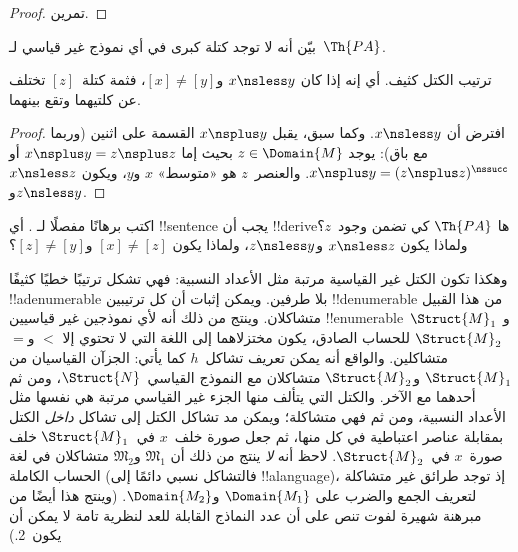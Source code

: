 \documentclass[../../../include/open-logic-section]{subfiles}
\begin{document}
\begin{proof}
تمرين.
\end{proof}

\begin{prob}
بيّن أنه لا توجد كتلة كبرى في أي نموذج غير قياسي لـ~$\Th{PA}$.
\end{prob}

\begin{prop}
ترتيب الكتل كثيف. أي إنه إذا كان $x \nsless y$ و$[x] \neq [y]$،
فثمة كتلة~$[z]$ تختلف عن كلتيهما وتقع بينهما.
\end{prop}

\begin{proof}
افترض أن $x \nsless y$. وكما سبق، يقبل $x \nsplus y$ القسمة على
اثنين (وربما مع باق): يوجد $z \in \Domain{M}$ بحيث إما
$x \nsplus y = z \nsplus z$ أو
$x \nsplus y = (z \nsplus z)^\nssucc$. والعنصر~$z$ هو
«متوسط» $x$ و$y$، ويكون $x \nsless z$ و$z \nsless y$.
\end{proof}

\begin{prob}
اكتب برهانًا مفصلًا لـ
. أي !!{sentence} يجب أن
!!{derive}ها $\Th{PA}$ كي تضمن وجود~$z$؟ ولماذا يكون $x \nsless z$
و$z \nsless y$، ولماذا يكون $[x] \neq [z]$ و$[z] \neq [y]$؟
\end{prob}

\begin{explain}
وهكذا تكون الكتل غير القياسية مرتبة مثل الأعداد النسبية: فهي تشكل
ترتيبًا خطيًا كثيفًا !!a{denumerable} بلا طرفين. ويمكن إثبات أن كل ترتيبين
!!{denumerable} من هذا القبيل متشاكلان. وينتج من ذلك أنه لأي نموذجين
غير قياسيين !!{enumerable}~$\Struct{M}_1$ و$\Struct{M}_2$ للحساب الصادق،
يكون مختزلاهما إلى اللغة التي لا تحتوي إلا $<$ و$=$ متشاكلين. والواقع
أنه يمكن تعريف تشاكل~$h$ كما يأتي: الجزآن القياسيان من $\Struct{M}_1$
و$\Struct{M}_2$ متشاكلان مع النموذج القياسي~$\Struct{N}$، ومن ثم
أحدهما مع الآخر. والكتل التي يتألف منها الجزء غير القياسي مرتبة هي نفسها
مثل الأعداد النسبية، ومن ثم فهي متشاكلة؛ ويمكن مد تشاكل الكتل إلى تشاكل
\emph{داخل} الكتل بمقابلة عناصر اعتباطية في كل منها، ثم جعل صورة خلف~$x$
في~$\Struct{M}_1$ خلف صورة~$x$ في~$\Struct{M}_2$. لاحظ أنه \emph{لا} ينتج من
ذلك أن $\mathfrak{M}_1$ و$\mathfrak{M}_2$ متشاكلان في لغة الحساب الكاملة
(فالتشاكل نسبي دائمًا إلى !!a{language})، إذ توجد طرائق غير متشاكلة لتعريف
الجمع والضرب على $\Domain{M_1}$ و$\Domain{M_2}$. (وينتج هذا أيضًا من
مبرهنة شهيرة لفوت تنص على أن عدد النماذج القابلة للعد لنظرية تامة لا يمكن
أن يكون~2.)
\end{explain}
\end{document}
